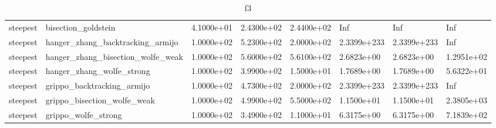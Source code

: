 \documentclass[a4paper,11pt]{article}
\numberwithin{equation}{section} %
\begin{document}
\begin{table}[h!]
{\begin{tabular}{|l|l|l|l|l|l|l|l|}
        steepest & bisection\_goldstein & 4.1000e+01 & 2.4300e+02 & 2.4400e+02 & Inf & Inf & Inf \\
        steepest & hanger\_zhang\_backtracking\_armijo & 1.0000e+02 & 5.2300e+02 & 2.0000e+02 & 2.3399e+233 & 2.3399e+233 & Inf \\
        steepest & hanger\_zhang\_bisection\_wolfe\_weak & 1.0000e+02 & 5.6000e+02 & 5.6100e+02 & 2.6823e+00 & 2.6823e+00 & 1.2951e+02 \\
        steepest & hanger\_zhang\_wolfe\_strong & 1.0000e+02 & 3.9900e+02 & 1.5000e+01 & 1.7689e+00 & 1.7689e+00 & 5.6322e+01 \\
        steepest & grippo\_backtracking\_armijo & 1.0000e+02 & 4.7300e+02 & 2.0000e+02 & 2.3399e+233 & 2.3399e+233 & Inf \\
        steepest & grippo\_bisection\_wolfe\_weak & 1.0000e+02 & 4.9900e+02 & 5.5000e+02 & 1.1500e+01 & 1.1500e+01 & 2.3805e+03 \\
        steepest & grippo\_wolfe\_strong & 1.0000e+02 & 3.4900e+02 & 1.1000e+01 & 6.3175e+00 & 6.3175e+00 & 7.1839e+02 \\

\end{tabular}}
\caption{f3}
\label{table:f3}
\end{table}
\end{document}
